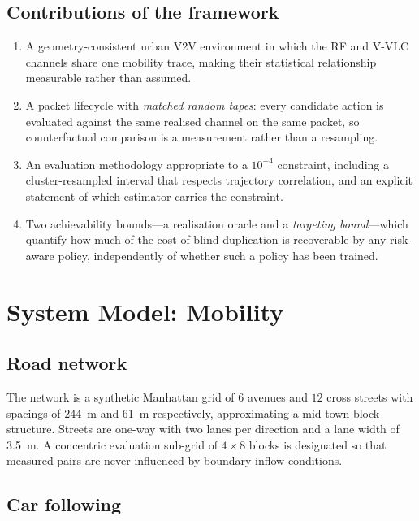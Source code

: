 \documentclass[conference]{IEEEtran}
\begin{document}
\subsection{Contributions of the framework}

\begin{enumerate}
\item A geometry-consistent urban V2V environment in which the RF and V-VLC
channels share one mobility trace, making their statistical relationship
measurable rather than assumed.
\item A packet lifecycle with \emph{matched random tapes}: every candidate
action is evaluated against the same realised channel on the same packet, so
counterfactual comparison is a measurement rather than a resampling.
\item An evaluation methodology appropriate to a $10^{-4}$ constraint,
including a cluster-resampled interval that respects trajectory correlation,
and an explicit statement of which estimator carries the constraint.
\item Two achievability bounds---a realisation oracle and a \emph{targeting
bound}---which quantify how much of the cost of blind duplication is
recoverable by any risk-aware policy, independently of whether such a policy
has been trained.
\end{enumerate}

\section{System Model: Mobility}
\label{sec:mobility}

\subsection{Road network}

The network is a synthetic Manhattan grid of $6$ avenues and $12$ cross
streets with spacings of \SI{244}{\meter} and \SI{61}{\meter} respectively,
approximating a mid-town block structure. Streets are one-way with two lanes
per direction and a lane width of \SI{3.5}{\meter}. A concentric evaluation
sub-grid of $4\times 8$ blocks is designated so that measured pairs are never
influenced by boundary inflow conditions.

\subsection{Car following}
\end{document}
